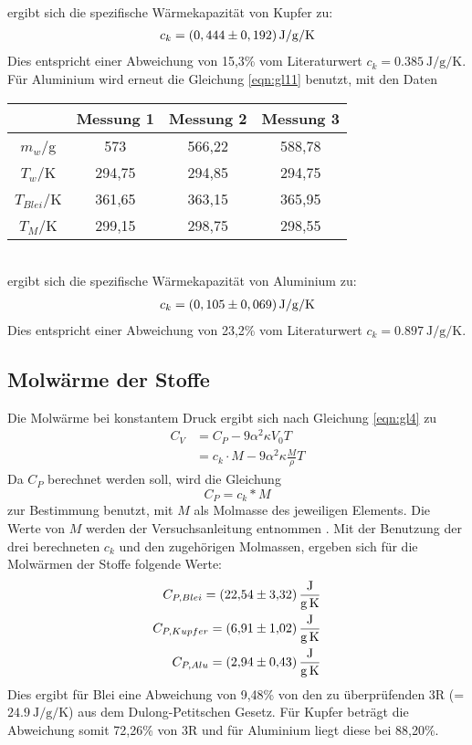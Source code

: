 \\
ergibt sich die spezifische Wärmekapazität von Kupfer zu:
\begin{align*}
  c_k = \left(0,444 \pm 0,192 \right) \si{{\joule\per\gram\per\kelvin}}
\end{align*}
Dies entspricht einer Abweichung von 15,3\% vom Literaturwert $c_k = \SI{0,385}{\joule\per\gram\per\kelvin}$.
Für Aluminium wird erneut die Gleichung \ref{eqn:gl11} benutzt, mit den Daten
\begin{table}
  \centering
  \label{tab:WerteBlei}
  \begin{tabular}{c c c c}
   \toprule
   & Messung 1 & Messung 2 & Messung 3 \\
   \midrule
   $m_w$/g & 573 & 566,22 & 588,78 \\
   $T_w$/K & 294,75 & 294,85 & 294,75 \\
   $T_{Blei}$/K & 361,65 & 363,15 & 365,95 \\
   $T_M$/K & 299,15 & 298,75 & 298,55 \\
   \bottomrule
  \end{tabular}
\end{table}
\\
ergibt sich die spezifische Wärmekapazität von Aluminium zu:
\begin{align*}
  c_k = \left(0,105 \pm 0,069 \right) \si{{\joule\per\gram\per\kelvin}}
\end{align*}
Dies entspricht einer Abweichung von 23,2\% vom Literaturwert $c_k = \SI{0,897}{\joule\per\gram\per\kelvin}$.

\subsection{Molwärme der Stoffe}
\label{sec:Molwärme}
Die Molwärme bei konstantem Druck ergibt sich nach Gleichung \ref{eqn:gl4} zu
\begin{align*}
  C_V &= C_P - 9 \alpha^2 \kappa V_0 T\\
  &= c_k \cdot M - 9 \alpha^2 \kappa \frac{M}{\rho}T
\end{align*}
Da $C_P$ berechnet werden soll, wird die Gleichung
\begin{equation}
  C_P = c_k * M
\end{equation}
zur Bestimmung benutzt, mit $M$ als Molmasse des jeweiligen Elements.
Die Werte von $M$ werden der Versuchsanleitung entnommen \cite{V201}.
Mit der Benutzung der drei berechneten $c_k$ und den zugehörigen Molmassen, ergeben sich für die Molwärmen der Stoffe folgende Werte:
\begin{align*}
  C_{P,Blei} = \SI{22,54 \pm 3.32}{\joule\per\gram\per\kelvin}\\
  C_{P,Kupfer} = \SI{6,91 \pm 1,02}{\joule\per\gram\per\kelvin}\\
  C_{P,Alu} = \SI{2,94 \pm 0,43}{\joule\per\gram\per\kelvin}
\end{align*}
Dies ergibt für Blei eine Abweichung von 9,48\% von den zu überprüfenden 3R (= $\SI{24,9}{\joule\per\gram\per\kelvin}$) aus dem Dulong-Petitschen Gesetz.
Für Kupfer beträgt die Abweichung somit 72,26\% von 3R und für Aluminium liegt diese bei 88,20\%.